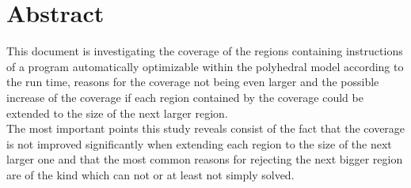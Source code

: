 \begingroup
\let\clearpage\relax
\let\cleardoublepage\relax
\let\cleardoublepage\relax

\chapter*{Abstract}
This document is investigating the coverage of the regions containing instructions of a program automatically optimizable within the polyhedral model according to the run time, reasons for the coverage not being even larger and the possible increase of the coverage if each region contained by the coverage could be extended to the size of the next larger region.\\
The most important points this study reveals consist of the fact that the coverage is not improved significantly when extending each region to the size of the next larger one and that the most common reasons for rejecting the next bigger region are of the kind which can not or at least not simply solved.
\begin{comment}
    \begin{itemize}
        \item Plakative Stichworte
        \item Kalauer?
        \item Ausblick
        \item Ergebnis
    \end{itemize}
\draftnote{
    \begin{itemize}
        \item Background: Give a brief introducing notice about the motivation for conducting the study.
        \item Objective: Describe the aim of the study, including the object under examination, the focus, and the perspective.
        \item Method: Describe which research method was used to examine the object (e.g., experimental design, number and kind of participants, selection criteria, data collection and analysis procedures).
        \item Results: Describe the main findings.
        \item Limitations: Describe the major limitations of the research, if any.
        \item Conclusion: Describe the impact of the results.
        \item lengths:
            \begin{itemize}
                \item background: one sentence
                \item important elements: objective, method, result and conclusion
            \end{itemize}
        \item keywords
    \end{itemize}
}
\end{comment}

